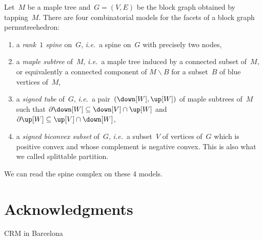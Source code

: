 \documentclass{amsart}
\theoremstyle{definition}
\newcommand{\ssm}{\smallsetminus} %
\newcommand{\ie}{\textit{i.e.}~} %
\newcommand{\darkblue}{\color{darkblue}} %
\newcommand{\defn}[1]{\textsl{\darkblue #1}} %
\begin{document}
Let~$M$ be a maple tree and~$G = (V,E)$ be the block graph obtained by tapping~$M$.
There are four combinatorial models for the facets of a block graph permutreehedron:
\begin{enumerate}
  \item a \defn{rank~$1$ spine} on~$G$, \ie a spine on~$G$ with precisely two nodes,
  \item a \defn{maple subtree} of~$M$, \ie a maple tree induced by a connected subset of~$M$, or equivalently a connected component of $M \ssm B$ for a subset~$B$ of blue vertices of~$M$,
  \item a \defn{signed tube} of~$G$, \ie a pair~$(\down[W], \up[W])$ of maple subtrees of~$M$ such that $\partial \down[W] \subseteq \down[V] \cap \up[W]$ and $\partial \up[W] \subseteq \up[V] \cap \down[W]$,
  \item a \defn{signed biconvex subset} of~$G$, \ie a subset~$V$ of vertices of~$G$ which is positive convex and whose complement is negative convex. This is also what we called splittable partition.
\end{enumerate}
We can read the spine complex on these 4 models.









\section*{Acknowledgments}

CRM in Barcelona 



\label{sec:biblio}
\end{document}
